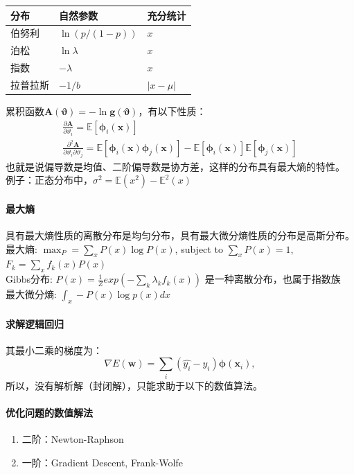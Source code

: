 \begin{table}[H]
\centering
\begin{tabular}{lll}
    \toprule
    分布 & 自然参数 & 充分统计 \\
    \midrule
    伯努利 & $\ln(p/(1-p))$ & $x$ \\
    泊松 & $\ln\lambda$ & $x$ \\
    指数 & $-\lambda$ & $x$ \\
    拉普拉斯 & $-1/b$ & $|x-\mu|$ \\
    \bottomrule
\end{tabular}
\end{table}
累积函数$\bm A(\bm\vartheta) = - \ln \bm g(\bm \vartheta)$，有以下性质：
$$
\begin{array}{l}
    \frac{\partial\bm A}{\partial \vartheta_i} = \mathbb{E}[\bm\phi_i(\bm x)] \\
    \frac{\partial^2\bm A}{\partial \vartheta_i\partial \vartheta_j} = \mathbb{E}[\bm\phi_i(\bm x)\bm\phi_j(\bm x)] - \mathbb{E}[\bm\phi_i(\bm x)]\mathbb{E}[\bm\phi_j(\bm x)]
\end{array}
$$
也就是说偏导数是均值、二阶偏导数是协方差，这样的分布具有最大熵的特性。
例子：正态分布中，$\sigma^2=\mathbb{E}(x^2)-\mathbb{E}^2(x)$

\paragraph{最大熵}
具有最大熵性质的离散分布是均匀分布，具有最大微分熵性质的分布是高斯分布。\\
最大熵: $\max_P = \sum_x P(x)\log P(x)$, subject to $\sum_x P(x)=1$, $F_k=\sum_x f_k(x)P(x)$ \\
Gibbs分布: $P(x)=\frac{1}{Z}exp(-\sum_k \lambda_k f_k(x))$ 是一种离散分布，也属于指数族 \\
最大微分熵: $\int_x -P(x)\log p(x)dx$ 


\paragraph{求解逻辑回归} 其最小二乘的梯度为：
$$\nabla E(\bm w) = \sum_i (\hat{y_i} - y_i)\bm \phi(\bm x_i),$$
所以，没有解析解（封闭解），只能求助于以下的数值算法。

\paragraph{优化问题的数值解法} 
\begin{enumerate}
    \item 二阶：Newton-Raphson
    \item 一阶：Gradient Descent, Frank-Wolfe
\end{enumerate}

